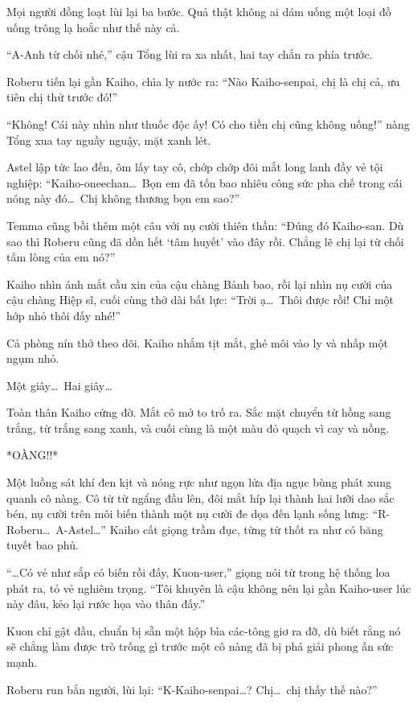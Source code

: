 \documentclass[../main.tex]{subfiles}
\begin{document}
Mọi người đồng loạt lùi lại ba bước. Quả thật không ai dám uống một loại đồ uống trông lạ hoắc như thế này cả.

``A-Anh từ chối nhé,'' cậu Tổng lùi ra xa nhất, hai tay chắn ra phía trước.

Roberu tiến lại gần Kaiho, chìa ly nước ra: ``Nào Kaiho-senpai, chị là chị cả, ưu tiên chị thử trước đó!''

``Không! Cái này nhìn như thuốc độc ấy! Có cho tiền chị cũng không uống!'' nàng Tổng xua tay nguầy nguậy, mặt xanh lét.

Astel lập tức lao đến, ôm lấy tay cô, chớp chớp đôi mắt long lanh đầy vẻ tội nghiệp: ``Kaiho-oneechan\dots\ Bọn em đã tốn bao nhiêu công sức pha chế trong cái nóng này đó\dots\ Chị không thương bọn em sao?''

Temma cũng bồi thêm một câu với nụ cười thiên thần: ``Đúng đó Kaiho-san. Dù sao thì Roberu cũng đã dồn hết `tâm huyết' vào đây rồi. Chẳng lẽ chị lại từ chối tấm lòng của em nó?''

Kaiho nhìn ánh mắt cầu xin của cậu chàng Bảnh bao, rồi lại nhìn nụ cười của cậu chàng Hiệp sĩ, cuối cùng thở dài bất lực: ``Trời ạ\dots\ Thôi được rồi! Chỉ một hớp nhỏ thôi đấy nhé!''

Cả phòng nín thở theo dõi. Kaiho nhắm tịt mắt, ghé môi vào ly và nhấp một ngụm nhỏ.

Một giây\dots\ Hai giây\dots

Toàn thân Kaiho cứng đờ. Mắt cô mở to trố ra. Sắc mặt chuyển từ hồng sang trắng, từ trắng sang xanh, và cuối cùng là một màu đỏ quạch vì cay và nồng.

*OÀNG!!*

Một luồng sát khí đen kịt và nóng rực như ngọn lửa địa ngục bùng phát xung quanh cô nàng. Cô từ từ ngẩng đầu lên, đôi mắt híp lại thành hai lưỡi dao sắc bén, nụ cười trên môi biến thành một nụ cười đe dọa đến lạnh sống lưng: ``R-Roberu\dots\ A-Astel\dots'' Kaiho cất giọng trầm đục, từng từ thốt ra như có băng tuyết bao phủ.

``\dots Có vẻ như sắp có biến rồi đấy, Kuon-user,'' giọng nói từ trong hệ thống loa phát ra, tỏ vẻ nghiêm trọng. ``Tôi khuyên là cậu không nên lại gần Kaiho-user lúc này đâu, kẻo lại rước họa vào thân đấy.''

Kuon chỉ gật đầu, chuẩn bị sẵn một hộp bìa các-tông giơ ra đỡ, dù biết rằng nó sẽ chẳng làm được trò trống gì trước một cô nàng đã bị phá giải phong ấn sức mạnh.

Roberu run bắn người, lùi lại: ``K-Kaiho-senpai\dots? Chị\dots\ chị thấy thế nào?''
\end{document}
